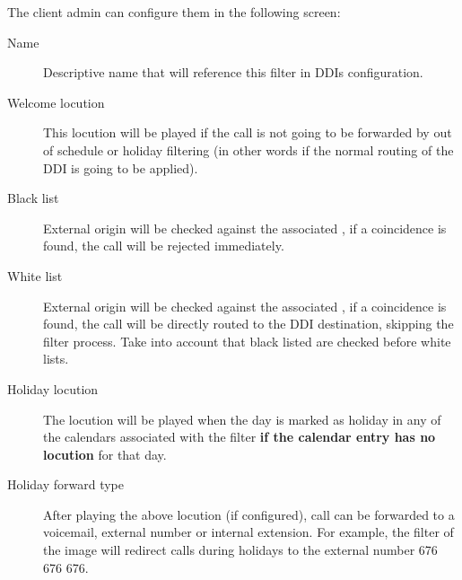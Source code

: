 \documentclass[letterpaper,10pt,english]{sphinxmanual}
\begin{document}
The client admin can configure them in the following screen:
\begin{description}
\item[{Name}] \leavevmode{}\label{administration_portal/client/vpbx/routing_tools/external_call_filters:term-name}
Descriptive name that will reference this filter in DDIs configuration.

\item[{Welcome locution}] \leavevmode{}\label{administration_portal/client/vpbx/routing_tools/external_call_filters:term-welcome-locution}
This locution will be played if the call is not going to be
forwarded by out of schedule or holiday filtering (in other words if
the normal routing of the DDI is going to be applied).

\item[{Black list}] \leavevmode{}\label{administration_portal/client/vpbx/routing_tools/external_call_filters:term-black-list}
External origin will be checked against the associated {\hyperref[administration_portal/client/vpbx/routing_tools/match_lists:match\string-lists]{}},
if a coincidence is found, the call will be rejected immediately.

\item[{White list}] \leavevmode{}\label{administration_portal/client/vpbx/routing_tools/external_call_filters:term-white-list}
External origin will be checked against the associated {\hyperref[administration_portal/client/vpbx/routing_tools/match_lists:match\string-lists]{}},
if a coincidence is found, the call will be directly routed to the DDI
destination, skipping the filter process. Take into account that black
listed are checked before white lists.

\item[{Holiday locution}] \leavevmode{}\label{administration_portal/client/vpbx/routing_tools/external_call_filters:term-holiday-locution}
The locution will be  played when the day is marked as holiday in any
of the calendars associated with the filter \textbf{if the calendar entry has
no locution} for that day.

\item[{Holiday forward type}] \leavevmode{}\label{administration_portal/client/vpbx/routing_tools/external_call_filters:term-holiday-forward-type}
After playing the above locution (if configured), call can be forwarded
to a voicemail, external number or internal extension. For example, the
filter of the image will redirect calls during holidays to the external
number 676 676 676.


\end{description}
\end{document}

